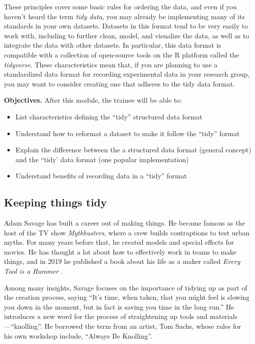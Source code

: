 \documentclass[]{tufte-book}
\providecommand{\tightlist}{%
  \setlength{\itemsep}{0pt}\setlength{\parskip}{0pt}}
\begin{document}
These principles cover some basic rules for ordering the data, and even if you
haven't heard the term \emph{tidy data}, you may already be implementing many of its
standards in your own datasets. Datasets in this format tend to be very easily
to work with, including to further clean, model, and visualize the data, as well
as to integrate the data with other datasets. In particular, this data format is
compatible with a collection of open-source tools on the R platform called the
\emph{tidyverse}. These characteristics mean that, if you are planning to use a
standardized data format for recording experimental data in your research group,
you may want to consider creating one that adheres to the tidy data format.

\textbf{Objectives.} After this module, the trainee will be able to:

\begin{itemize}
\tightlist
\item
  List characteristics defining the ``tidy'' structured data format
\item
  Understand how to reformat a dataset to make it follow the ``tidy'' format
\item
  Explain the difference between the a structured data format (general concept)
  and the ``tidy' data format (one popular implementation)
\item
  Understand benefits of recording data in a ``tidy'' format
\end{itemize}

\subsection{Keeping things tidy}\label{keeping-things-tidy}

Adam Savage has built a career out of making things. He became famous as the
host of the TV show \emph{Mythbusters}, where a crew builds contraptions to test
urban myths. For many years before that, he created models and special effects
for movies. He has thought a lot about how to effectively work in teams to make
things, and in 2019 he published a book about his life as a maker called \emph{Every
Tool is a Hammer} \citep{savage2020every}.

Among many insights, Savage focuses on the importance
of tidying up as part of the creation process, saying ``It's time, when taken,
that you might feel is slowing you down in the moment, but in fact is saving you
time in the long run.'' \citep{savage2020every} He introduces a new word for the
process of straightening up tools and materials---``knolling''. He borrowed the
term from an artist, Tom Sachs, whose rules for his own workshop include,
``Always Be Knolling''.
\end{document}
